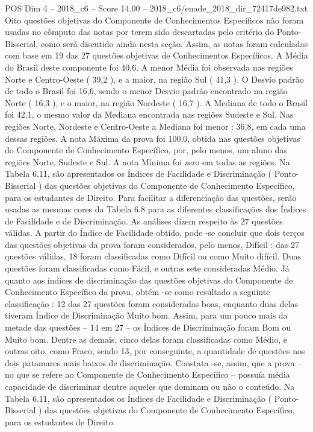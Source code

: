 \begin{textsample}{POS Dim 4 – 2018\_c6 – Score 14.00 – 2018\_c6/enade\_2018\_dir\_72417de982.txt}
Oito questões objetivas do Componente de Conhecimentos Específicos não foram usadas no cômputo das notas por terem sido descartadas pelo critério do Ponto-Bisserial, como será discutido ainda nesta seção.
Assim, as notas foram calculadas com base em 19 das 27 questões objetivas de Conhecimentos Específicos.
A Média do Brasil deste componente foi 40,6.
A menor Média foi observada nas regiões Norte e Centro-Oeste ( 39,2 ), e a maior, na região Sul ( 41,3 ).
O Desvio padrão de todo o Brasil foi 16,6, sendo o menor Desvio padrão encontrado na região Norte ( 16,3 ), e o maior, na região Nordeste ( 16,7 ).
A Mediana de todo o Brasil foi 42,1, o mesmo valor da Mediana encontrada nas regiões Sudeste e Sul.
Nas regiões Norte, Nordeste e Centro-Oeste a Mediana foi menor : 36,8, em cada uma dessas regiões.
A nota Máxima da prova foi 100,0, obtida nas questões objetivas do Componente de Conhecimento Específico, por, pelo menos, um aluno das regiões Norte, Sudeste e Sul.
A nota Mínima foi zero em todas as regiões.
Na Tabela 6.11, são apresentados os Índices de Facilidade e Discriminação ( Ponto-Bisserial ) das questões objetivas do Componente de Conhecimento Específico, para os estudantes de Direito.
Para facilitar a diferenciação das questões, serão usadas as mesmas cores da Tabela 6.8 para as diferentes classificações dos Índices de Facilidade e de Discriminação.
As análises dizem respeito às 27 questões válidas.
A partir do Índice de Facilidade obtido, pode -se concluir que dois terços das questões objetivas da prova foram considerados, pelo menos, Difícil : das 27 questões válidas, 18 foram classificadas como Difícil ou como Muito difícil.
Duas questões foram classificadas como Fácil, e outras sete consideradas Médio.
Já quanto aos índices de discriminação das questões objetivas do Componente de Conhecimento Específico da prova, obtém -se como resultado a seguinte classificação : 12 das 27 questões foram consideradas boas, enquanto duas delas tiveram Índice de Discriminação Muito bom.
Assim, para um pouco mais da metade das questões – 14 em 27 – os Índices de Discriminação foram Bom ou Muito bom.
Dentre as demais, cinco delas foram classificadas como Médio, e outras oito, como Fraco, sendo 13, por conseguinte, a quantidade de questões nos dois patamares mais baixos de discriminação.
Constata -se, assim, que a prova – no que se refere ao Componente de Conhecimento Específico – possuía média capacidade de discriminar dentre aqueles que dominam ou não o conteúdo.
Na Tabela 6.11, são apresentados os Índices de Facilidade e Discriminação ( Ponto-Bisserial ) das questões objetivas do Componente de Conhecimento Específico, para os estudantes de Direito.

\end{textsample}
